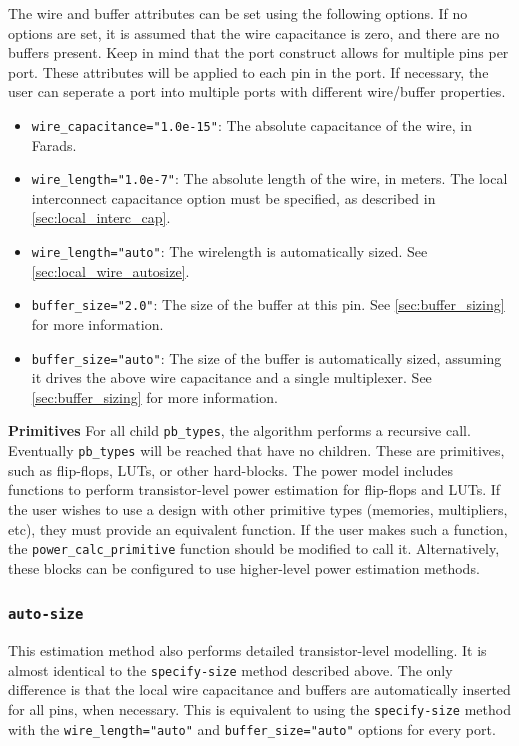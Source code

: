 \documentclass[letterpaper,twoside,10pt]{article}
\begin{document}
The wire and buffer attributes can be set using the following options.  If no options are set, it is assumed that the wire capacitance is zero, and there are no buffers present.  Keep in mind that the port construct allows for multiple pins per port.  These attributes will be applied to each pin in the port.  If necessary, the user can seperate a port into multiple ports with different wire/buffer properties.
\begin{itemize}
	\item \texttt{wire\_capacitance="1.0e-15"}: The absolute capacitance of the wire, in Farads.
	\item \texttt{wire\_length="1.0e-7"}: The absolute length of the wire, in meters.  The local interconnect capacitance option must be specified, as described in \autoref{sec:local_interc_cap}.
	\item \texttt{wire\_length="auto"}: The wirelength is automatically sized.  See \autoref{sec:local_wire_autosize}.
	\item \texttt{buffer\_size="2.0"}: The size of the buffer at this pin.  See \autoref{sec:buffer_sizing} for more information.
	\item \texttt{buffer\_size="auto"}: The size of the buffer is automatically sized, assuming it drives the above wire capacitance and a single multiplexer.  
	See \autoref{sec:buffer_sizing} for more information.
\end{itemize}

\textbf{Primitives}
For all child \texttt{pb\_types}, the algorithm performs a recursive call. Eventually \texttt{pb\_types} will be reached that have no children.  
These are primitives, such as flip-flops, LUTs, or other hard-blocks.  The power model includes functions to perform transistor-level power estimation for flip-flops and LUTs. 
If the user wishes to use a design with other primitive types (memories, multipliers, etc), they must provide an equivalent function.  If the user makes such a function, the \texttt{power\_calc\_primitive} function should be modified to call it.  Alternatively, these blocks can be configured to use higher-level power estimation methods.


\subsubsection{\texttt{auto-size}}
This estimation method also performs detailed transistor-level modelling.  It is almost identical to the \texttt{specify-size} method described above.  The only difference is that the local wire capacitance and buffers are automatically inserted for all pins, when necessary.  This is equivalent to using the \texttt{specify-size} method with the \texttt{wire\_length="auto"} and 
\texttt{buffer\_size="auto"} options for every port.
\end{document}
